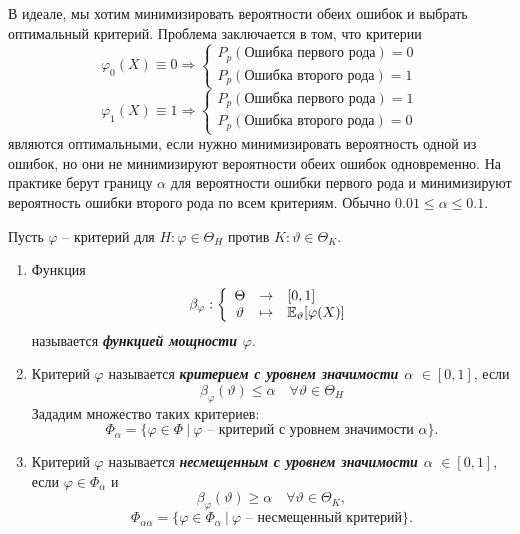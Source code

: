 \begin{rmrk}
	В идеале, мы хотим минимизировать вероятности обеих ошибок и выбрать оптимальный критерий. Проблема заключается в том, что критерии
	\[ \varphi_0(X) \equiv 0 \Rightarrow
	\left \{
	\begin{array}{cl}
	P_p(\text{Ошибка первого рода}) = 0 \\
	P_p(\text{Ошибка второго рода}) = 1
	\end{array}
	\right.
	\]
	\[ \varphi_1(X) \equiv 1 \Rightarrow
	\left \{
	\begin{array}{cl}
	P_p(\text{Ошибка первого рода}) = 1 \\
	P_p(\text{Ошибка второго рода}) = 0
	\end{array}
	\right.
	\]
	являются оптимальными, если нужно минимизировать вероятность одной из ошибок, но они не минимизируют вероятности обеих ошибок одновременно. На практике берут границу $\alpha$ для вероятности ошибки первого рода и минимизируют вероятность ошибки второго рода по всем критериям. Обычно $0.01 \leq \alpha \leq 0.1$. 
\end{rmrk}

\begin{defn}
	Пусть $\varphi$ -- критерий для $H: \varphi \in \Theta_H \text{ против } K:\vartheta \in \Theta_K$.
	\begin{enumerate}
		\item Функция
		\[ \beta_\varphi:
		\left \{
		\begin{array}{ccl}
        \Theta & \rightarrow & [0, 1] \\
		\vartheta & \mapsto & \mathbb{E}_\vartheta[\varphi(X)]
		\end{array}
		\right.
		\]
		называется \textbf{\textit{функцией мощности $\varphi$}}.
		\item Критерий $\varphi$ называется \textbf{\textit{критерием с уровнем значимости $\alpha$}} $\in [0, 1]$, если
		\[ \beta_\varphi(\vartheta) \leq \alpha \quad \forall \vartheta \in \Theta_H \]
		Зададим множество таких критериев:
		\[ \Phi_\alpha = \{ \varphi \in \Phi \ |\ \varphi \text{ -- критерий с уровнем значимости }\alpha  \}. \]
		\item Критерий $\varphi$ называется \textbf{\textit{несмещенным с уровнем значимости $\alpha$}} $\in [0, 1]$, если $\varphi \in \Phi_\alpha$ и
		\[ \beta_\varphi(\vartheta) \geq \alpha \quad  \forall \vartheta \in \Theta_K, \]
		\[  \Phi_{\alpha \alpha} = \{ \varphi  \in \Phi_\alpha \ |\ \varphi \text{ -- несмещенный критерий}  \}. \]
	\end{enumerate}
\end{defn}

